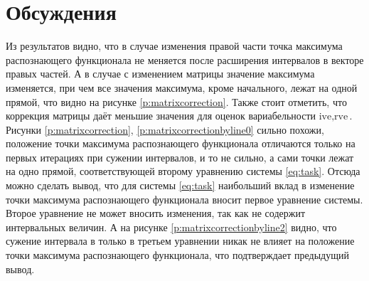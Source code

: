 \documentclass[a4paper,12pt]{article}
\begin{document}
    \section{Обсуждения}
    Из результатов видно, что в случае изменения правой части точка максимума распознающего функционала не меняется после расширения интервалов в векторе правых частей.
    А в случае с изменением матрицы значение максимума изменяется, при чем все значения максимума, кроме начального, лежат на одной прямой, что видно на рисунке \ref{p:matrixcorrection}.
    Также стоит отметить, что коррекция матрицы даёт меньшие значения для оценок вариабельности $ \text{ive}, \text{rve} $. \newline
    Рисунки \ref{p:matrixcorrection}, \ref{p:matrixcorrectionbyline0} сильно похожи, положение точки максимума распознающего функционала отличаются только на первых итерациях при сужении интервалов, и то не сильно, а сами точки лежат на одно прямой, соответствующей второму уравнению системы \ref{eq:task}.
    Отсюда можно сделать вывод, что для системы \ref{eq:task} наибольший вклад в изменение точки максимума распознающего функционала вносит первое уравнение системы.
    Второе уравнение не может вносить изменения, так как не содержит интервальных величин. А на рисунке \ref{p:matrixcorrectionbyline2} видно, что сужение интервала в только в третьем уравнении никак не влияет на положение точки максимума распознающего функционала, что подтверждает предыдущий вывод. 
\end{document}
